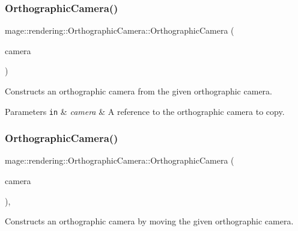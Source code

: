 \subsubsection{\texorpdfstring{Orthographic\+Camera()}{OrthographicCamera()}\hspace{0.1cm}{\footnotesize\ttfamily [2/3]}}
{\footnotesize\ttfamily mage\+::rendering\+::\+Orthographic\+Camera\+::\+Orthographic\+Camera (\begin{DoxyParamCaption}\item[{const \mbox{\hyperlink{classmage_1_1rendering_1_1_orthographic_camera}{Orthographic\+Camera}} \&}]{camera }\end{DoxyParamCaption})\hspace{0.3cm}{\ttfamily [delete]}}

Constructs an orthographic camera from the given orthographic camera.


\begin{DoxyParams}[1]{Parameters}
\mbox{\tt in}  & {\em camera} & A reference to the orthographic camera to copy. \\
\hline
\end{DoxyParams}
\mbox{\label{classmage_1_1rendering_1_1_orthographic_camera_a5b2c7d870e2077807057246abf3b76b1}} 
\subsubsection{\texorpdfstring{Orthographic\+Camera()}{OrthographicCamera()}\hspace{0.1cm}{\footnotesize\ttfamily [3/3]}}
{\footnotesize\ttfamily mage\+::rendering\+::\+Orthographic\+Camera\+::\+Orthographic\+Camera (\begin{DoxyParamCaption}\item[{\mbox{\hyperlink{classmage_1_1rendering_1_1_orthographic_camera}{Orthographic\+Camera}} \&\&}]{camera }\end{DoxyParamCaption})\hspace{0.3cm}{\ttfamily [default]}, {\ttfamily [noexcept]}}

Constructs an orthographic camera by moving the given orthographic camera.


